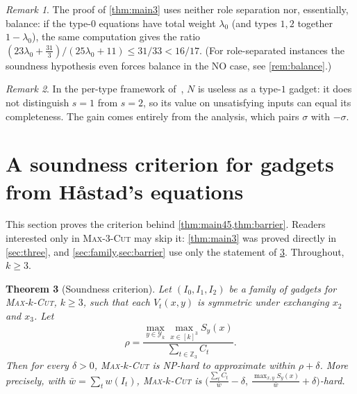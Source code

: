 \documentclass[11pt,letterpaper]{article}
\newtheorem{theorem}{Theorem}[section]
\theoremstyle{remark}
\newtheorem{remark}[theorem]{Remark}
\newcommand{\MC}[1]{\textup{\textsc{Max-$#1$-Cut}}}
\newcommand{\Z}{\mathbb{Z}}
\newcommand{\Y}{\mathcal{Y}}
\begin{document}
\begin{remark}
The proof of \cref{thm:main3} uses neither role separation nor, essentially, balance: if the type-$0$
equations have total weight $\lambda_0$ (and types $1,2$ together $1-\lambda_0$), the same computation gives
the ratio $(23\lambda_0+\frac{31}{3})/(25\lambda_0+11)\le 31/33<16/17$. (For role-separated instances the
soundness hypothesis even forces balance in the NO case, see \cref{rem:balance}.)
\end{remark}

\begin{remark}
In the per-type framework of~\cite{NRT25,TSSW00}, $N$ is useless as a type-$1$ gadget: it does not
distinguish $s=1$ from $s=2$, so its value on unsatisfying inputs can equal its completeness. The gain
comes entirely from the analysis, which pairs $\sigma$ with $-\sigma$.
\end{remark}

\section{A soundness criterion for gadgets from H\aa stad's equations}\label{sec:S}

This section proves the criterion behind \cref{thm:main45,thm:barrier}. Readers interested only in
\MC{3} may skip it: \cref{thm:main3} was proved directly in \cref{sec:three}, and
\cref{sec:family,sec:barrier} use only the statement of \cref{thm:S}. Throughout, $k\ge 3$.

\begin{theorem}[Soundness criterion]\label{thm:S}
Let $(I_0,I_1,I_2)$ be a family of gadgets for \MC{k}, $k\ge 3$, such that each $V_t(x,y)$ is symmetric
under exchanging $x_2$ and $x_3$. Let
\[
  \rho = \frac{\max_{y\in\Y_k}\max_{x\in[k]^3}S_y(x)}{\sum_{t\in\Z_3}C_t}.
\]
Then for every $\delta>0$, \MC{k} is NP-hard to approximate within $\rho+\delta$. More precisely, with
$\bar w=\sum_t w(I_t)$, \MC{k} is $\big(\frac{\sum_t C_t}{\bar w}-\delta,\ \frac{\max_{x,y}S_y(x)}{\bar w}
+\delta\big)$-hard.
\end{theorem}
\end{document}
